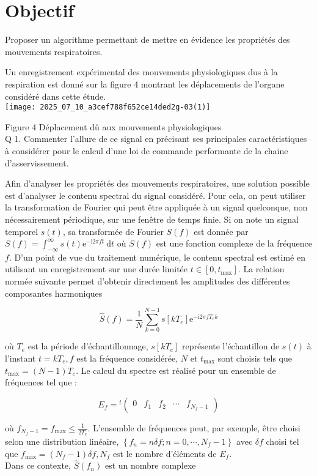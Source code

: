 \section*{Objectif}
Proposer un algorithme permettant de mettre en évidence les propriétés des mouvements respiratoires.

Un enregistrement expérimental des mouvements physiologiques dus à la respiration est donné sur la figure 4 montrant les déplacements de l'organe considéré dans cette étude.\\
\texttt{[image: 2025\_07\_10\_a3cef788f652ce14ded2g-03(1)]}

Figure 4 Déplacement dû aux mouvements physiologiques\\
Q 1. Commenter l'allure de ce signal en précisant ses principales caractéristiques à considérer pour le calcul d'une loi de commande performante de la chaine d'asservissement.

Afin d'analyser les propriétés des mouvements respiratoires, une solution possible est d'analyser le contenu spectral du signal considéré. Pour cela, on peut utiliser la transformation de Fourier qui peut être appliquée à un signal quelconque, non nécessairement périodique, sur une fenêtre de temps finie. Si on note un signal temporel $s(t)$, sa transformée de Fourier $S(f)$ est donnée par $S(f)=\int_{-\infty}^{\infty} s(t) \mathrm{e}^{-\mathrm{i} 2 \pi f t} \mathrm{~d} t$ où $S(f)$ est une fonction complexe de la fréquence $f$. D'un point de vue du traitement numérique, le contenu spectral est estimé en utilisant un enregistrement sur une durée limitée $t \in\left[0, t_{\max }\right]$. La relation normée suivante permet d'obtenir directement les amplitudes des différentes composantes harmoniques

$$
\hat{S}(f)=\frac{1}{N} \sum_{k=0}^{N-1} s\left[k T_{e}\right] \mathrm{e}^{-\mathrm{i} 2 \pi f T_{e} k}
$$

où $T_{e}$ est la période d'échantillonnage, $s\left[k T_{e}\right]$ représente l'échantillon de $s(t)$ à l'instant $t=k T_{e}, f$ est la fréquence considérée, $N$ et $t_{\max }$ sont choisis tels que $t_{\max }=(N-1) T_{e}$. Le calcul du spectre est réalisé pour un ensemble de fréquences tel que :

$$
E_{f}={ }^{t}\left(\begin{array}{lllll}
0 & f_{1} & f_{2} & \cdots & f_{N_{f}-1}
\end{array}\right)
$$

où $f_{N_{f}-1}=f_{\max } \leqslant \frac{1}{2 T_{e}}$. L'ensemble de fréquences peut, par exemple, être choisi selon une distribution linéaire, $\left\{f_{n}=n \delta f ; n=0, \cdots, N_{f}-1\right\}$ avec $\delta f$ choisi tel que $f_{\max }=\left(N_{f}-1\right) \delta f, N_{f}$ est le nombre d'éléments de $E_{f}$.\\
Dans ce contexte, $\hat{S}\left(f_{n}\right)$ est un nombre complexe

